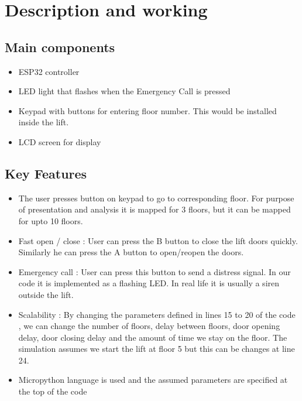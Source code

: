 \documentclass{article}
\begin{document}
\section{Description and working}

\subsection {Main components}
\begin{itemize}
\item ESP32 controller 
\item LED light that flashes when the Emergency Call is pressed
\item Keypad with buttons for entering floor number. This would be installed inside the lift.
\item LCD screen for display

\end{itemize}


\subsection {Key Features}
\begin{itemize}
\item The user presses button on keypad to go to corresponding floor. For purpose of presentation and analysis it is mapped for 3 floors, but it can be mapped for upto 10 floors.
\item Fast open / close : User can press the B button to close the lift doors quickly. Similarly he can press the A button to open/reopen the doors.
\label{item:fast_open_close}
\item Emergency call : User can press this button to send a distress signal. In our code it is implemented as a flashing LED. In real life it is usually a siren outside the lift.
\item Scalability : By changing the parameters defined in lines 15 to 20 of the code , we can change the number of floors, delay between floors, door opening delay, door closing delay and the amount of time we stay on the floor. The simulation assumes we start the lift at floor 5 but this can be changes at line 24.

\item \gls{Micropython} language is used and the assumed parameters are specified at the top of the code
\end{itemize}
\end{document}
